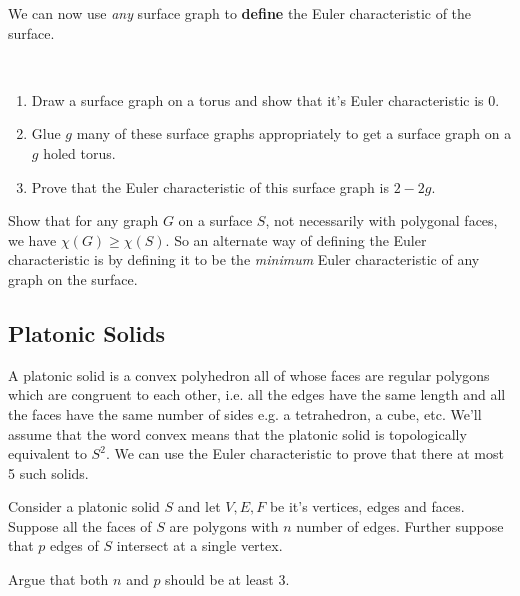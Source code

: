 We can now use \emph{any} surface graph to \textbf{define} the Euler characteristic of the surface.

\begin{exercise} 
	$\quad$
	\begin{enumerate}
		\item Draw a surface graph on a torus and show that it's Euler characteristic is 0.
		\item Glue $g$ many of these surface graphs appropriately to get a surface graph on a $g$ holed torus.
		\item Prove that the Euler characteristic of this surface graph is $2-2g$.
	\end{enumerate}
\end{exercise}


\begin{exercise}
	Show that for any graph $G$ on a surface $S$, not necessarily with polygonal faces, we have $\chi(G) \ge \chi(S)$. So an alternate way of defining the Euler characteristic is by defining it to be the \emph{minimum} Euler characteristic of any graph on the surface.
\end{exercise}

\subsection{Platonic Solids}
A platonic solid is a convex polyhedron all of whose faces are regular polygons which are congruent to each other, i.e. all the edges have the same length and all the faces have the same number of sides e.g. a tetrahedron, a cube, etc. We'll assume that the word convex means that the platonic solid is topologically equivalent to $S^2$. We can use the Euler characteristic to prove that there at most 5 such solids.

Consider a platonic solid $ S $ and let $V,E,F$ be it's vertices, edges and faces. Suppose all the faces of $ S $ are polygons with $ {n} $ number of edges. Further suppose that $ {p} $ edges of $S $ intersect at a single vertex.

\begin{exercise}
	Argue that both $ n $ and $ p $ should be at least 3.
\end{exercise}

